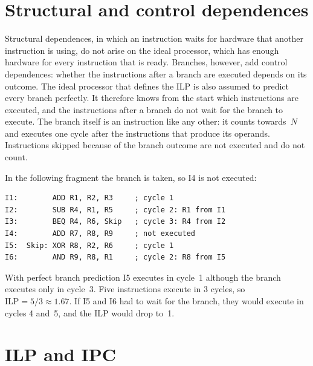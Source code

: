 \documentclass[../main.tex]{subfiles}
\begin{document}
\section{Structural and control dependences}
\label{sec:l06-control}

Structural dependences, in which an instruction waits for hardware that
another instruction is using, do not arise on the ideal processor, which
has enough hardware for every instruction that is ready.  Branches, however, add control dependences: whether
the instructions after a branch are executed depends on its outcome.  The
ideal processor that defines the ILP is also assumed to predict every
branch perfectly.  It therefore knows from the start which instructions are
executed, and the instructions after a branch do not wait for the branch to
execute.  The branch itself is an instruction like any other: it counts
towards~$N$ and executes one cycle after the instructions that produce its
operands.  Instructions skipped because of the branch outcome are not
executed and do not count.

\begin{example}
  \label{ex:l06-control}
  In the following fragment the branch is taken, so I4 is not executed:
  \begin{lstlisting}[language={[x86masm]Assembler}, numbers=none]
I1:        ADD R1, R2, R3     ; cycle 1
I2:        SUB R4, R1, R5     ; cycle 2: R1 from I1
I3:        BEQ R4, R6, Skip   ; cycle 3: R4 from I2
I4:        ADD R7, R8, R9     ; not executed
I5:  Skip: XOR R8, R2, R6     ; cycle 1
I6:        AND R9, R8, R1     ; cycle 2: R8 from I5
\end{lstlisting}
  With perfect branch prediction I5 executes in cycle~1 although the branch
  executes only in cycle~3.  Five instructions execute in 3 cycles, so
  $\text{ILP} = 5/3 \approx 1.67$.  If I5 and I6 had to wait for the branch,
  they would execute in cycles 4 and~5, and the ILP would drop to~1.
\end{example}

\section{ILP and IPC}
\label{sec:l06-ipc}
\end{document}

